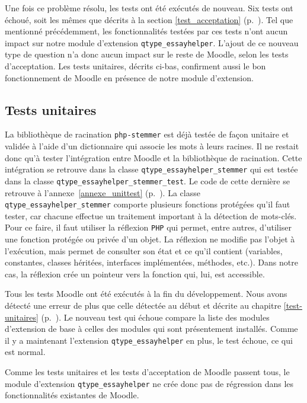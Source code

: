 Une fois ce probl\`eme r\'esolu, les tests ont \'et\'e ex\'ecut\'es de nouveau. Six tests ont \'echou\'e, soit les m\^emes que d\'ecrits \`a la section \ref{test_acceptation} (p.~\pageref{test_acceptation}).
Tel que mentionn\'e pr\'ec\'edemment, les fonctionnalit\'es test\'ees par ces tests n'ont aucun impact sur notre module d'extension \texttt{qtype\_essayhelper}.
L'ajout de ce nouveau type de question n'a donc aucun impact sur le reste de Moodle, selon les tests d'acceptation.
Les tests unitaires, d\'ecrits ci-bas, confirment aussi le bon fonctionnement de Moodle en pr\'esence de notre module d'extension.

\subsection{Tests unitaires} \label{dev_test_unitaire}
La biblioth\`eque de racination \texttt{php-stemmer} est d\'ej\`a test\'ee de fa\c{c}on unitaire et valid\'ee \`a l'aide d'un dictionnaire qui associe les mots \`a leurs racines.
Il ne restait donc qu'\`a tester l'int\'egration entre Moodle et la biblioth\`eque de racination.
Cette int\'egration se retrouve dans la classe \texttt{qtype\_essayhelper\_stemmer} qui est test\'ee dans la classe \texttt{qtype\_essayhelper\_stemmer\_test}.
Le code de cette derni\`ere se retrouve \`a l'annexe~\ref{annexe_unittest} (p.~\pageref{annexe_unittest}).
La classe \texttt{qtype\_essayhelper\_stemmer} comporte plusieurs fonctions prot\'eg\'ees qu'il faut tester, car chacune effectue un traitement important \`a la d\'etection de mots-cl\'es.
Pour ce faire, il faut utiliser la r\'eflexion \texttt{PHP} qui permet, entre autres, d'utiliser une fonction prot\'eg\'ee ou priv\'ee d'un objet.
La r\'eflexion ne modifie pas l'objet \`a l'ex\'ecution, mais permet de consulter son \'etat et ce qu'il contient (variables, constantes, classes h\'erit\'ees, interfaces impl\'ement\'ees, m\'ethodes, etc.).
Dans notre cas, la r\'eflexion cr\'ee un pointeur vers la fonction qui, lui, est accessible.

Tous les tests Moodle ont \'et\'e ex\'ecut\'es \`a la fin du d\'eveloppement.
Nous avons d\'etect\'e une erreur de plus que celle d\'etect\'ee au d\'ebut et d\'ecrite au chapitre \ref{test-unitaires} (p.~\pageref{test-unitaires}).
Le nouveau test qui \'echoue compare la liste des modules d'extension de base \`a celles des modules qui sont pr\'esentement install\'es.
Comme il y a maintenant l'extension \texttt{qtype\_essayhelper} en plus, le test \'echoue, ce qui est normal.

Comme les tests unitaires et les tests d'acceptation de Moodle passent tous, le module d'extension \texttt{qtype\_essayhelper} ne cr\'ee donc pas de r\'egression dans les fonctionnalit\'es existantes de Moodle.
